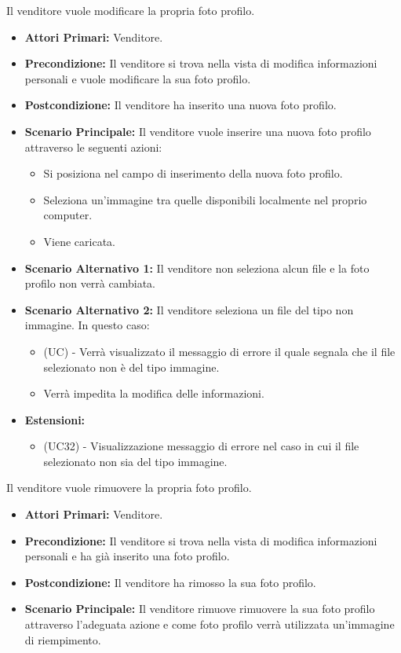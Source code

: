 Il venditore vuole modificare la propria foto profilo.
\begin{itemize}
    \item \textbf{Attori Primari:} Venditore.
    \item \textbf{Precondizione:} Il venditore si trova nella vista di modifica informazioni personali e vuole modificare la sua foto profilo.
    \item \textbf{Postcondizione:} Il venditore ha inserito una nuova foto profilo.
    \item \textbf{Scenario Principale:} Il venditore vuole inserire una nuova foto profilo attraverso le seguenti azioni:
    \begin{itemize}
        \item Si posiziona nel campo di inserimento della nuova foto profilo.
        \item Seleziona un'immagine tra quelle disponibili localmente nel proprio computer.
        \item Viene caricata.
    \end{itemize}
    \item \textbf{Scenario Alternativo 1:} Il venditore non seleziona alcun file e la foto profilo non verrà cambiata.
    \item \textbf{Scenario Alternativo 2:} Il venditore seleziona un file del tipo non immagine. In questo caso:
    \begin{itemize}
        \item (UC) - Verrà visualizzato il messaggio di errore il quale segnala che il file selezionato non è del tipo immagine.
        \item Verrà impedita la modifica delle informazioni.
    \end{itemize}
    \item \textbf{Estensioni:}
    \begin{itemize}
        \item (UC32) - Visualizzazione messaggio di errore nel caso in cui il file selezionato non sia del tipo immagine.
    \end{itemize}
\end{itemize}

Il venditore vuole rimuovere la propria foto profilo.
\begin{itemize}
    \item \textbf{Attori Primari:} Venditore.
    \item \textbf{Precondizione:} Il venditore si trova nella vista di modifica informazioni personali e ha già inserito una foto profilo.
    \item \textbf{Postcondizione:} Il venditore ha rimosso la sua foto profilo.
    \item \textbf{Scenario Principale:} Il venditore rimuove rimuovere la sua foto profilo attraverso l'adeguata azione e come foto profilo verrà utilizzata un'immagine di riempimento.
\end{itemize}

